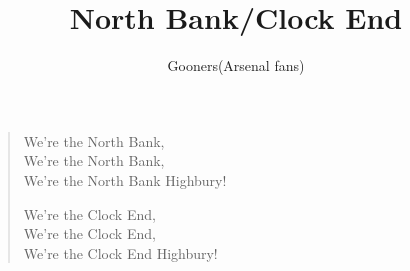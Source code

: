 \documentclass[a4paper,12pt]{article}
\title{North Bank/Clock End}
\author{Gooners(Arsenal fans)}
\date{}
\begin{document}
	
	\maketitle
	
	\begin{verse}
		
		We're the North Bank, \\
		We're the North Bank, \\
		We're the North Bank Highbury!\par
		We're the Clock End, \\
		We're the Clock End, \\
		We're the Clock End Highbury!
		
	\end{verse}
	
\end{document}
